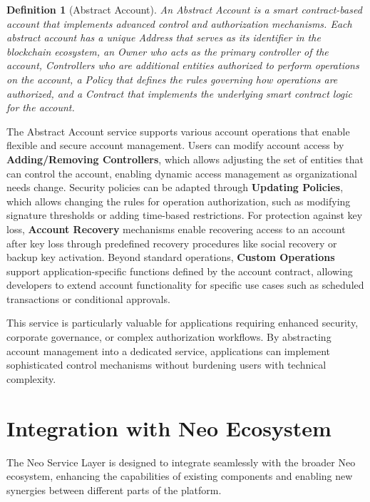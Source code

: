 \documentclass[11pt]{article}
\newtheorem{definition}{Definition}
\begin{document}
\begin{definition}[Abstract Account]
An Abstract Account is a smart contract-based account that implements advanced control and authorization mechanisms. Each abstract account has a unique Address that serves as its identifier in the blockchain ecosystem, an Owner who acts as the primary controller of the account, Controllers who are additional entities authorized to perform operations on the account, a Policy that defines the rules governing how operations are authorized, and a Contract that implements the underlying smart contract logic for the account.
\end{definition}

The Abstract Account service supports various account operations that enable flexible and secure account management. Users can modify account access by \textbf{Adding/Removing Controllers}, which allows adjusting the set of entities that can control the account, enabling dynamic access management as organizational needs change. Security policies can be adapted through \textbf{Updating Policies}, which allows changing the rules for operation authorization, such as modifying signature thresholds or adding time-based restrictions. For protection against key loss, \textbf{Account Recovery} mechanisms enable recovering access to an account after key loss through predefined recovery procedures like social recovery or backup key activation. Beyond standard operations, \textbf{Custom Operations} support application-specific functions defined by the account contract, allowing developers to extend account functionality for specific use cases such as scheduled transactions or conditional approvals.

This service is particularly valuable for applications requiring enhanced security, corporate governance, or complex authorization workflows. By abstracting account management into a dedicated service, applications can implement sophisticated control mechanisms without burdening users with technical complexity.

\section{Integration with Neo Ecosystem}
\label{subsec:nsl-integration}

The Neo Service Layer is designed to integrate seamlessly with the broader Neo ecosystem, enhancing the capabilities of existing components and enabling new synergies between different parts of the platform.
\end{document}
